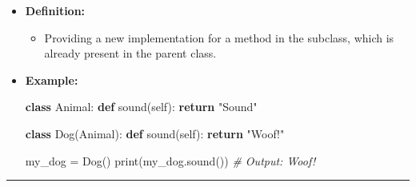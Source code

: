 \documentclass[11pt]{article}
\makeatletter
\providecommand{\tightlist}{%
      \setlength{\itemsep}{0pt}\setlength{\parskip}{0pt}}
\newenvironment{Shaded}{}{}
\newcommand{\KeywordTok}[1]{\textcolor[rgb]{0.00,0.44,0.13}{\textbf{{#1}}}}
\newcommand{\StringTok}[1]{\textcolor[rgb]{0.25,0.44,0.63}{{#1}}}
\newcommand{\CommentTok}[1]{\textcolor[rgb]{0.38,0.63,0.69}{\textit{{#1}}}}
\newcommand{\NormalTok}[1]{{#1}}
\newcommand{\VariableTok}[1]{\textcolor[rgb]{0.10,0.09,0.49}{{#1}}}
\newcommand{\ControlFlowTok}[1]{\textcolor[rgb]{0.00,0.44,0.13}{\textbf{{#1}}}}
\newcommand{\OperatorTok}[1]{\textcolor[rgb]{0.40,0.40,0.40}{{#1}}}
\newcommand{\BuiltInTok}[1]{{#1}}
\newcommand{\boxspacing}{\kern\kvtcb@left@rule\kern\kvtcb@boxsep}
\newcommand{\prompt}[4]{
        \ttfamily\llap{{\color{#2}[#3]:\hspace{3pt}#4}}\vspace{-\baselineskip}
    }
\makeatother
\begin{document}
\begin{itemize}
\item
  \textbf{Definition:}

  \begin{itemize}
  \tightlist
  \item
    Providing a new implementation for a method in the subclass, which
    is already present in the parent class.
  \end{itemize}
\item
  \textbf{Example:}

\begin{Shaded}
\begin{Highlighting}[]
\KeywordTok{class}\NormalTok{ Animal:}
    \KeywordTok{def}\NormalTok{ sound(}\VariableTok{self}\NormalTok{):}
        \ControlFlowTok{return} \StringTok{"Sound"}

\KeywordTok{class}\NormalTok{ Dog(Animal):}
    \KeywordTok{def}\NormalTok{ sound(}\VariableTok{self}\NormalTok{):}
        \ControlFlowTok{return} \StringTok{"Woof!"}

\NormalTok{my_dog }\OperatorTok{=}\NormalTok{ Dog()}
\BuiltInTok{print}\NormalTok{(my_dog.sound())  }\CommentTok{# Output: Woof!}
\end{Highlighting}
\end{Shaded}
\end{itemize}

\begin{center}\rule{0.5\linewidth}{\linethickness}\end{center}

    \begin{tcolorbox}[breakable, size=fbox, boxrule=1pt, pad at break*=1mm,colback=cellbackground, colframe=cellborder]
\prompt{In}{incolor}{ }{\boxspacing}
\begin{Verbatim}[commandchars=\\\{\}]

\end{Verbatim}
\end{tcolorbox}


    
    
    
\end{document}
